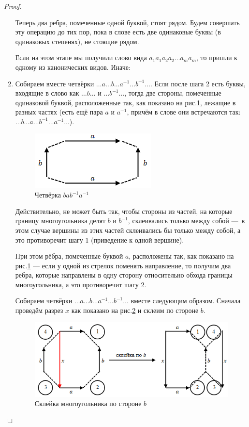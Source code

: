 \begin{proof}
\begin{enumerate}
        Теперь два ребра, помеченные одной буквой, стоят рядом. Будем совершать эту операцию до тих пор, пока в слове есть две одинаковые буквы (в одинаковых степенях), не стоящие рядом.

        Если на этом этапе мы получили слово вида $a_1 a_1 a_2 a_2 \dots a_m a_m$, то пришли к одному из канонических видов. Иначе:

        \item Собираем вместе четвёрки $\dots a \dots b \dots a^{-1} \dots b^{-1} \dots$.
        Если после шага 2 есть буквы, входящие в слово как $\dots b \dots$ и $\dots b^{-1} \dots$, тогда две стороны, помеченные одинаковой буквой, расположенные так, как показано на рис.\ref{fig:c10.7}, лежащие в разных частях (есть ещё пара $a$ и $a^{-1}$, причём в слове они встречаются так: $\dots b \dots a \dots b^{-1} \dots a^{-1} \dots$).

        \begin{figure}[htbp]
            \centering
            \includegraphics[scale=0.7]{images/c10.7.png}
            \caption{Четвёрка $b a b^{-1} a^{-1}$}
            \label{fig:c10.7}
        \end{figure}

        Действительно, не может быть так, чтобы стороны из частей, на которые границу многоугольника делят $b$ и $b^{-1}$, склеивались только между собой — в этом случае вершины из этих частей склеивались бы только между собой, а это противоречит шагу 1 (приведение к одной вершине).

        При этом рёбра, помеченные буквой $a$, расположены так, как показано на рис.\ref{fig:c10.7} — если у одной из стрелок поменять направление, то получим два ребра, которые направлены в одну сторону относительно обхода границы многоугольника, а это противоречит шагу 2.

        Собираем четвёрки $\dots a \dots b \dots a^{-1} \dots b^{-1} \dots$ вместе следующим образом. Сначала проведём разрез $x$ как показано на рис.\ref{fig:c10.8} и склеим по стороне $b$.

        \begin{figure}[htbp]
            \centering
            \includegraphics[scale=0.7]{images/c10.8.png}
            \caption{Склейка многоугольника по стороне $b$}
            \label{fig:c10.8}
        \end{figure}


\end{enumerate}
\end{proof}
